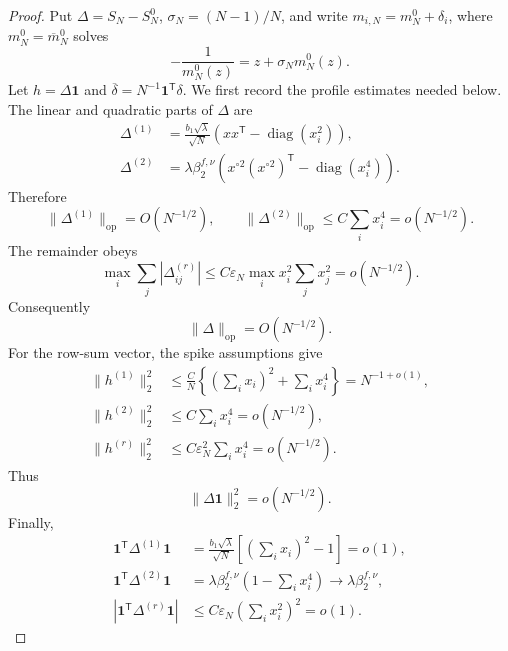 \documentclass[11pt]{article}
\theoremstyle{definition}
\theoremstyle{remark}
\newcommand{\diag}{\operatorname{diag}}
\newcommand{\op}{\mathrm{op}}
\newcommand{\one}{\mathbf 1}
\newcommand{\norm}[1]{\lVert #1\rVert}
\begin{document}
\begin{proof}
Put \(\Delta=S_N-S_N^0\),
\(\sigma_N=(N-1)/N\), and write
\(m_{i,N}=m_N^0+\delta_i\), where \(m_N^0=\overline m_N^0\) solves
\begin{equation}\label{eq:R3-finite-flat-QVE}
 -\frac1{m_N^0(z)}=z+\sigma_Nm_N^0(z).
\end{equation}
Let \(h=\Delta\one\) and
\(\overline\delta=N^{-1}\one^{\mathsf T}\delta\).  We first record the
profile estimates needed below.  The linear and quadratic parts of
\(\Delta\) are
\begin{align*}
 \Delta^{(1)}
 &=\frac{b_1\sqrt\lambda}{\sqrt N}
 \left(xx^{\mathsf T}-\diag(x_i^2)\right),\\
 \Delta^{(2)}
 &=\lambda\beta_2^{f,\nu}
 \left(x^{\circ2}(x^{\circ2})^{\mathsf T}-\diag(x_i^4)\right).
\end{align*}
Therefore
\[
 \norm{\Delta^{(1)}}_{\op}=O(N^{-1/2}),
 \qquad
 \norm{\Delta^{(2)}}_{\op}
 \le C\sum_i x_i^4=o(N^{-1/2}).
\]
The remainder obeys
\[
 \max_i\sum_j|\Delta^{(r)}_{ij}|
 \le C\varepsilon_N\max_i x_i^2\sum_jx_j^2
 =o(N^{-1/2}).
\]
Consequently
\begin{equation}\label{eq:R3-Delta-op}
 \norm\Delta_{\op}=O(N^{-1/2}).
\end{equation}
For the row-sum vector, the spike assumptions give
\begin{align*}
 \norm{h^{(1)}}_2^2
 &\le\frac C N
 \left\{\left(\sum_i x_i\right)^2+\sum_i x_i^4\right\}
 =N^{-1+o(1)},\\
 \norm{h^{(2)}}_2^2
 &\le C\sum_i x_i^4=o(N^{-1/2}),\\
 \norm{h^{(r)}}_2^2
 &\le C\varepsilon_N^2\sum_i x_i^4=o(N^{-1/2}).
\end{align*}
Thus
\begin{equation}\label{eq:R3-Delta-one}
 \norm{\Delta\one}_2^2=o(N^{-1/2}).
\end{equation}
Finally,
\begin{align}
 \one^{\mathsf T}\Delta^{(1)}\one
 &=\frac{b_1\sqrt\lambda}{\sqrt N}
 \left[\left(\sum_i x_i\right)^2-1\right]=o(1),
 \nonumber\\
 \one^{\mathsf T}\Delta^{(2)}\one
 &=\lambda\beta_2^{f,\nu}
 \left(1-\sum_i x_i^4\right)
 \longrightarrow\lambda\beta_2^{f,\nu},
 \nonumber\\
 |\one^{\mathsf T}\Delta^{(r)}\one|
 &\le C\varepsilon_N\left(\sum_i x_i^2\right)^2=o(1).
 \label{eq:R3-Delta-mass}
\end{align}


\end{proof}
\end{document}
